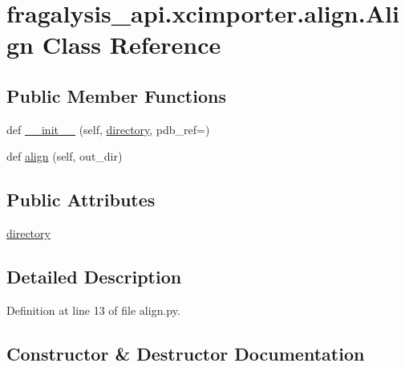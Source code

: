 \hypertarget{classfragalysis__api_1_1xcimporter_1_1align_1_1_align}{}\section{fragalysis\+\_\+api.\+xcimporter.\+align.\+Align Class Reference}
\label{classfragalysis__api_1_1xcimporter_1_1align_1_1_align}
\subsection*{Public Member Functions}
\begin{DoxyCompactItemize}
\item 
def \hyperlink{classfragalysis__api_1_1xcimporter_1_1align_1_1_align_a28e5edc1a05680d36665012eff20a271}{\+\_\+\+\_\+init\+\_\+\+\_\+} (self, \hyperlink{classfragalysis__api_1_1xcimporter_1_1align_1_1_align_aaa8ff46caee489ab4cab5279ac946bcc}{directory}, pdb\+\_\+ref=\textquotesingle{}\textquotesingle{})
\item 
def \hyperlink{classfragalysis__api_1_1xcimporter_1_1align_1_1_align_a554c8cc5acbc9f5e86bb668c49ea1254}{align} (self, out\+\_\+dir)
\end{DoxyCompactItemize}
\subsection*{Public Attributes}
\begin{DoxyCompactItemize}
\item 
\hyperlink{classfragalysis__api_1_1xcimporter_1_1align_1_1_align_aaa8ff46caee489ab4cab5279ac946bcc}{directory}
\end{DoxyCompactItemize}


\subsection{Detailed Description}


Definition at line 13 of file align.\+py.



\subsection{Constructor \& Destructor Documentation}
\mbox{\label{classfragalysis__api_1_1xcimporter_1_1align_1_1_align_a28e5edc1a05680d36665012eff20a271}} 

